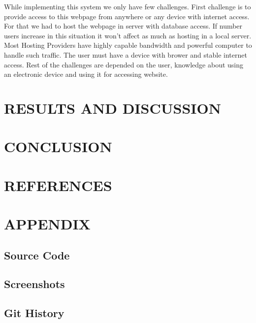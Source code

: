 \documentclass[a4paper,12pt]{report}
\begin{document}
While implementing this system we only have few challenges. First challenge is to provide access to this webpage from anywhere or any device with internet access. For that we had to host the webpage in server with database access. If number users increase in this situation it won't affect as much as hosting in a local server. Most Hosting Providers have highly capable bandwidth and powerful computer to handle such traffic. The user must have a device with brower and stable internet access. Rest of the challenges are depended on the user, knowledge about using an electronic device and using it for accessing website. \\

\pagebreak

\chapter{RESULTS AND DISCUSSION}


\pagebreak

\chapter{CONCLUSION}


\pagebreak


\chapter{REFERENCES}


\pagebreak

\chapter{APPENDIX}


\section{Source Code}

\section{Screenshots}

\pagebreak

\section{Git History}
\end{document}
